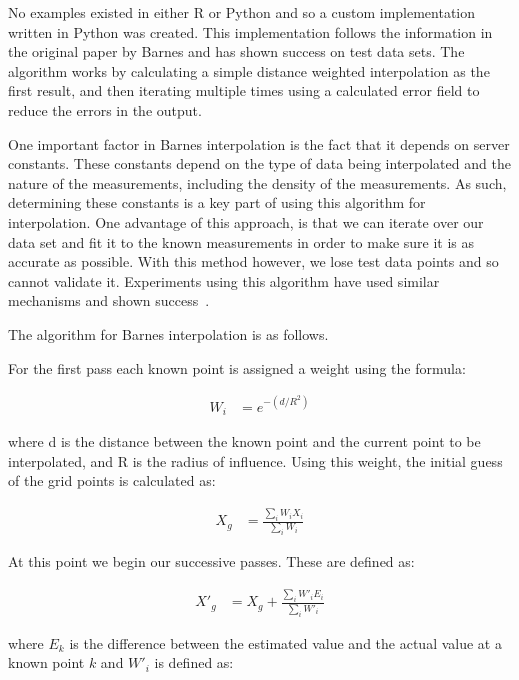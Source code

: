             No examples existed in either R or Python and so a custom implementation written in Python was created. This implementation follows the information in the original paper by Barnes and has shown success on test data sets. The algorithm works by calculating a simple distance weighted interpolation as the first result, and then iterating multiple times using a calculated error field to reduce the errors in the output. 

            One important factor in Barnes interpolation is the fact that it depends on server constants. These constants depend on the type of data being interpolated and the nature of the measurements, including the density of the measurements. As such, determining these constants is a key part of using this algorithm for interpolation. One advantage of this approach, is that we can iterate over our data set and fit it to the known measurements in order to make sure it is as accurate as possible. With this method however, we lose test data points and so cannot validate it. Experiments using this algorithm have used similar mechanisms and shown success~\cite{pmconcentrationmaps}.

            The algorithm for Barnes interpolation is as follows.

            For the first pass each known point is assigned a weight using the formula: 

            \begin{align*}
                W_{i} &= e^{-(d/R^{2})}
            \end{align*}
            
            where d is the distance between the known point and the current point to be interpolated, and R is the radius of influence. Using this weight, the initial guess of the grid points is calculated as: 
            
            \begin{align*}
                X_{g} &= \frac{\sum_{i}{W_{i}X_{i}}}{\sum_{i}{W_{i}}}
            \end{align*}

            At this point we begin our successive passes. These are defined as:

            \begin{align*}
                X'_{g} &= X_{g} + \frac{\sum_{i}{W'_{i}E_{i}}}{\sum_{i}{W'_{i}}}
            \end{align*}

            where $E_{k}$ is the difference between the estimated value and the actual value at a known point $k$ and $W'_{i}$ is defined as:

